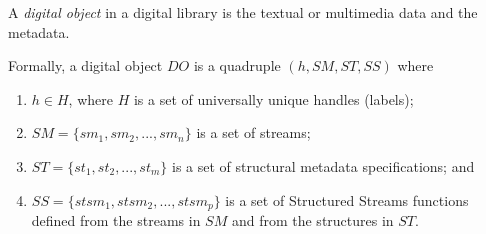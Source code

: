 \documentclass[12pt]{article}
\begin{document}
A \emph{digital object} in a digital library is the textual or multimedia data and the metadata.

Formally, a digital object $DO$ is a quadruple $(h, SM, ST, SS)$ where
\begin{enumerate}
\item $h\in H$, where $H$ is a set of universally unique handles (labels);
\item $SM = \lbrace sm_1, sm_2, . . . , sm_n\rbrace$ is a set of streams;
\item $ST = \lbrace st_1, st_2, . . . , st_m\rbrace$ is a set of structural metadata specifications; and
\item $SS = \lbrace stsm_1, stsm_2, . . . , stsm_p\rbrace$ is a set of Structured Streams functions defined from the streams in $SM$ and from the structures in $ST$.
\end{enumerate}
\end{document}
